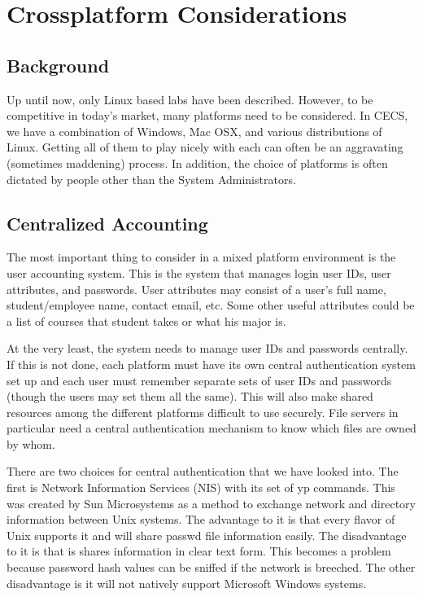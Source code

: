 \section{Crossplatform Considerations} \label{sec:crossplatform}
\subsection{Background}
Up until now, only Linux based labs have been described.  However, to be competitive in today's market, many platforms need to be considered.  In CECS, we have a combination of Windows, Mac OSX, and various distributions of Linux.   Getting all of them to play nicely with each can often be an aggravating (sometimes maddening) process.  In addition, the choice of platforms is often dictated by people other than the System Administrators. 
\subsection{Centralized Accounting}
The most important thing to consider in a mixed platform environment is the user accounting system.  This is the system that manages login user IDs, user attributes, and passwords.  User attributes may consist of a user's full name, student/employee name, contact email, etc.  Some other useful attributes could be a list of courses that student takes or what his major is.  

At the very least, the system needs to manage user IDs and passwords centrally.  If this is not done, each platform must have its own central authentication system set up and each user must remember separate sets of user IDs and passwords (though the users may set them all the same).  This will also make shared resources among the different platforms difficult to use securely.  File servers in particular need a central authentication mechanism to know which files are owned by whom.  

There are two choices for central authentication that we have looked into.  The first is Network Information Services (NIS) with its set of yp commands.  This was created by Sun Microsystems as a method to exchange network and directory information between Unix systems.  The advantage to it is that every flavor of Unix supports it and will share passwd file information easily.  The disadvantage to it is that is shares information in clear text form.  This becomes a problem because password hash values can be sniffed if the network is breeched.  The other disadvantage is it will not natively support Microsoft Windows systems.  

